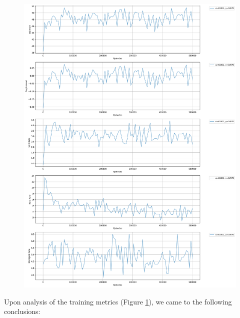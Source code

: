 \documentclass[10pt]{article}
\theoremstyle{definition}
\begin{document}
\begin{figure}[H]
    \centering
    \includegraphics[width=\textwidth]{./images/learning_curves_summary.png}
    \label{fig:training_metrics}
\end{figure}
Upon analysis of the training metrics (Figure \ref{fig:training_metrics}), we came to the following conclusions:
\end{document}
